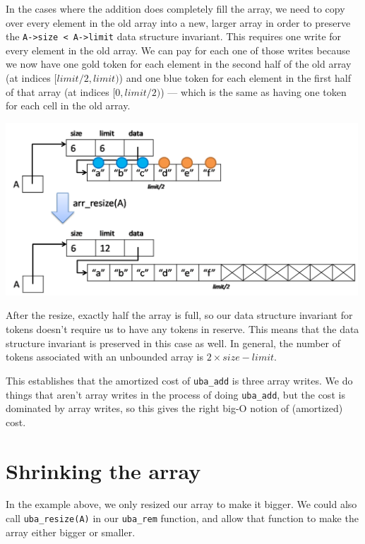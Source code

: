 In the cases where the addition does completely fill the array, we
need to copy over every element in the old array into a new, larger
array in order to preserve the \lstinline'A->size < A->limit' data
structure invariant.  This requires one write for every element in the
old array.  We can pay for each one of those writes because we now
have one gold token for each element in the second half of the old array
(at indices $\lbrack \mathit{limit}/2, \mathit{limit})$) and one blue token for
each element in the first half of that array (at indices $\lbrack 0,
\mathit{limit}/2)$) --- which is the same as having one token for each
cell in the old array.
\begin{center}
\includegraphics[width=0.99\textwidth]{img/doubleB.png}
\end{center}
After the resize, exactly half the array is full, so our data
structure invariant for tokens doesn't require us to have any tokens
in reserve. This means that the data structure invariant is preserved
in this case as well.  In general, the number of tokens associated
with an unbounded array is $2\times\mathit{size} - \mathit{limit}$.

This establishes that the amortized cost of \lstinline'uba_add' is
three array writes.  We do things that aren't array writes in the
process of doing \lstinline'uba_add', but the cost is dominated by
array writes, so this gives the right big-O notion of (amortized)
cost.

\section{Shrinking the array}
\label{sec:ubarrays:shrinking}

In the example above, we only resized our array to make it bigger. We
could also call \lstinline'uba_resize(A)' in our \lstinline'uba_rem'
function, and allow that function to make the array either bigger or
smaller.

